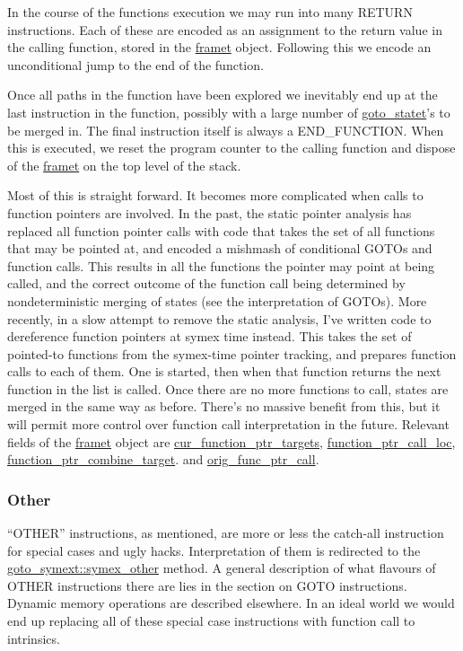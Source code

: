 \documentclass{article}
\begin{document}
In the course of the functions execution we may run into many RETURN
instructions. Each of these are encoded as an assignment to the return value
in the calling function, stored in the \url{framet} object. Following this
we encode an unconditional jump to the end of the function.

Once all paths in the function have been explored we inevitably end up at the
last instruction in the function, possibly with a large number of
\url{goto_statet}'s to be merged in. The final instruction itself is
always a END\_FUNCTION. When this is executed, we reset the program counter to
the calling function and dispose of the \url{framet} on the top level of the
stack.

Most of this is straight forward. It becomes more complicated when calls to
function pointers are involved. In the past, the static pointer analysis
has replaced all function pointer calls with code that takes the set of all
functions that may be pointed at, and encoded a mishmash of conditional GOTOs
and function calls. This results in all the functions the pointer may point at
being called, and the correct outcome of the function call being determined
by nondeterministic merging of states (see the interpretation of GOTOs). More
recently, in a slow attempt to remove the static analysis, I've written code
to dereference function pointers at symex time instead. This takes the set of
pointed-to functions from the symex-time pointer tracking, and prepares function
calls to each of them. One is started, then when that function returns the next
function in the list is called. Once there are no more functions to call,
states are merged in the same way as before. There's no massive benefit from
this, but it will permit more control over function call interpretation in
the future. Relevant fields of the \url{framet} object are
\url{cur_function_ptr_targets}, \url{function_ptr_call_loc},
\url{function_ptr_combine_target}. and
\url{orig_func_ptr_call}.

\subsubsection{Other}

``OTHER'' instructions, as mentioned, are more or less the catch-all instruction
for special cases and ugly hacks. Interpretation of them is redirected to the
\url{goto_symext::symex_other} method. A general description of what
flavours of OTHER instructions there are lies in the section on GOTO
instructions. Dynamic memory operations are described elsewhere. In an ideal
world we would end up replacing all of these special case instructions with
function call to intrinsics.
\end{document}
